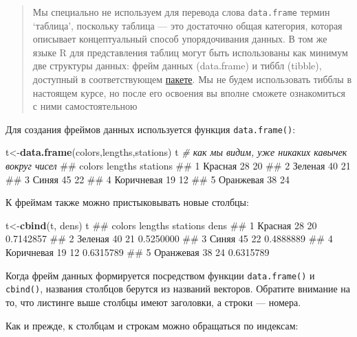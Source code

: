 \documentclass[]{book}
\newenvironment{Shaded}{\begin{snugshade}}{\end{snugshade}}
\newcommand{\KeywordTok}[1]{\textcolor[rgb]{0.13,0.29,0.53}{\textbf{#1}}}
\newcommand{\CommentTok}[1]{\textcolor[rgb]{0.56,0.35,0.01}{\textit{#1}}}
\newcommand{\NormalTok}[1]{#1}
\begin{document}
\begin{quote}
Мы специально не используем для перевода слова \texttt{data.frame}
термин `таблица', поскольку таблица --- это достаточно общая категория,
которая описывает концептуальный способ упорядочивания данных. В том же
языке R для представления таблиц могут быть использованы как минимум две
структуры данных: фрейм данных (data.frame) и тиббл (tibble), доступный
в соответствующем
\href{https://cran.r-project.org/web/packages/tibble/index.html}{пакете}.
Мы не будем использовать тибблы в настоящем курсе, но после его освоения
вы вполне сможете ознакомиться с ними самостоятельною
\end{quote}

Для создания фреймов данных используется функция \texttt{data.frame()}:

\begin{Shaded}
\begin{Highlighting}[]
\NormalTok{t<-}\KeywordTok{data.frame}\NormalTok{(colors,lengths,stations)}
\NormalTok{t  }\CommentTok{# как мы видим, уже никаких кавычек вокруг чисел}
\NormalTok{##       colors lengths stations}
\NormalTok{## 1    Красная      28       20}
\NormalTok{## 2    Зеленая      40       21}
\NormalTok{## 3      Синяя      45       22}
\NormalTok{## 4 Коричневая      19       12}
\NormalTok{## 5  Оранжевая      38       24}
\end{Highlighting}
\end{Shaded}

К фреймам также можно пристыковывать новые столбцы:

\begin{Shaded}
\begin{Highlighting}[]
\NormalTok{t<-}\KeywordTok{cbind}\NormalTok{(t, dens)}
\NormalTok{t}
\NormalTok{##       colors lengths stations      dens}
\NormalTok{## 1    Красная      28       20 0.7142857}
\NormalTok{## 2    Зеленая      40       21 0.5250000}
\NormalTok{## 3      Синяя      45       22 0.4888889}
\NormalTok{## 4 Коричневая      19       12 0.6315789}
\NormalTok{## 5  Оранжевая      38       24 0.6315789}
\end{Highlighting}
\end{Shaded}

Когда фрейм данных формируется посредством функции \texttt{data.frame()}
и \texttt{cbind()}, названия столбцов берутся из названий векторов.
Обратите внимание на то, что листинге выше столбцы имеют заголовки, а
строки --- номера.

Как и прежде, к столбцам и строкам можно обращаться по индексам:
\end{document}
